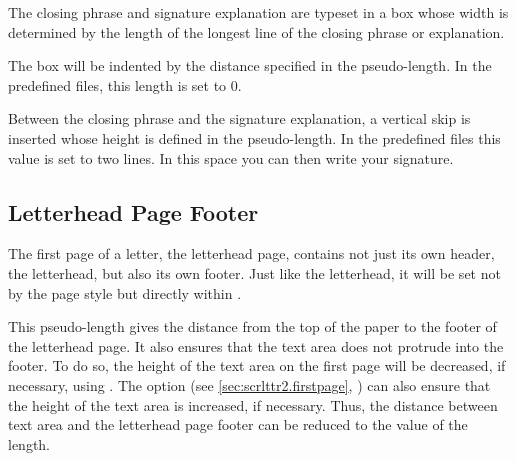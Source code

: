 \begin{Declaration}
\end{Declaration}
The closing phrase and signature
explanation are typeset in a box whose width is determined by the length of
the longest line of the closing phrase or explanation.

The box will be indented by the distance specified in the 
pseudo-length. In the predefined  files, this length is set to 0.

Between the closing phrase and the signature explanation, a vertical skip is
inserted whose height is defined in the 
pseudo-length. In the predefined  files this value is set to two lines. In this
space you can then write your signature.%
\iffalse%
\ If you decide to include a facsimile of your signature in the
\DescRef{scrlttr2.variable.signature}\IndexVariable{signature}%
\important{\DescRef{scrlttr2.variable.signature}} with the
\Package{graphicx}\IndexPackage{graphicx} package, it would be useful
to reduce the value of \PLength{sigbeforevskip} and thus the gap between
the closing phrase and the signature.%
\fi%
\EndIndexGroup
%
\EndIndexGroup


\subsection{Letterhead Page Footer}
%
\BeginIndexGroup
{}%

The first page of a letter, the letterhead page, contains not just its own
header, the letterhead, but also its own footer. Just like the letterhead, it will be set not by the page
style but directly within %
.

\begin{Declaration}
\end{Declaration}
This pseudo-length gives the distance from the top of the paper to the footer
of the letterhead page. It also ensures that the text area does not protrude
into the footer. To do so, the height of the text area on the first page will
be decreased, if necessary, using
%
. The
%
 option (see
\autoref{sec:scrlttr2.firstpage},
) can also ensure that the
height of the text area is increased, if necessary. Thus, the distance between
text area and the letterhead page footer can be reduced to the value of the
 length.

